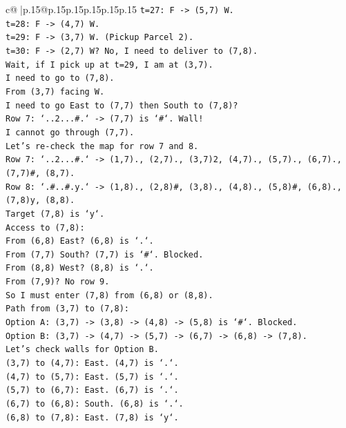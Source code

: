 \documentclass{article}
\begin{document}
{\begin{supertabular}{c@{$\;$}|p{.15\linewidth}@{}p{.15\linewidth}p{.15\linewidth}p{.15\linewidth}p{.15\linewidth}p{.15\linewidth}}
{{{\texttt{t=27: F {-}> (5,7) W.} \\
\texttt{t=28: F {-}> (4,7) W.} \\
\texttt{t=29: F {-}> (3,7) W. (Pickup Parcel 2).} \\
\texttt{t=30: F {-}> (2,7) W? No, I need to deliver to (7,8).} \\
\texttt{Wait, if I pick up at t=29, I am at (3,7).} \\
\texttt{I need to go to (7,8).} \\
\texttt{From (3,7) facing W.} \\
\texttt{I need to go East to (7,7) then South to (7,8)?} \\
\texttt{Row 7: `..2...\#.` {-}> (7,7) is `\#`. Wall!} \\
\texttt{I cannot go through (7,7).} \\
\texttt{Let's re{-}check the map for row 7 and 8.} \\
\texttt{Row 7: `..2...\#.` {-}> (1,7)., (2,7)., (3,7)2, (4,7)., (5,7)., (6,7)., (7,7)\#, (8,7).} \\
\texttt{Row 8: `.\#..\#.y.` {-}> (1,8)., (2,8)\#, (3,8)., (4,8)., (5,8)\#, (6,8)., (7,8)y, (8,8).} \\
\texttt{Target (7,8) is `y`.} \\
\texttt{Access to (7,8):} \\
\texttt{From (6,8) East? (6,8) is `.`.} \\
\texttt{From (7,7) South? (7,7) is `\#`. Blocked.} \\
\texttt{From (8,8) West? (8,8) is `.`.} \\
\texttt{From (7,9)? No row 9.} \\
\texttt{So I must enter (7,8) from (6,8) or (8,8).} \\
\texttt{Path from (3,7) to (7,8):} \\
\texttt{Option A: (3,7) {-}> (3,8) {-}> (4,8) {-}> (5,8) is `\#`. Blocked.} \\
\texttt{Option B: (3,7) {-}> (4,7) {-}> (5,7) {-}> (6,7) {-}> (6,8) {-}> (7,8).} \\
\texttt{Let's check walls for Option B.} \\
\texttt{(3,7) to (4,7): East. (4,7) is `.`.} \\
\texttt{(4,7) to (5,7): East. (5,7) is `.`.} \\
\texttt{(5,7) to (6,7): East. (6,7) is `.`.} \\
\texttt{(6,7) to (6,8): South. (6,8) is `.`.} \\
\texttt{(6,8) to (7,8): East. (7,8) is `y`.} \\
}}}
\end{supertabular}}
\end{document}
